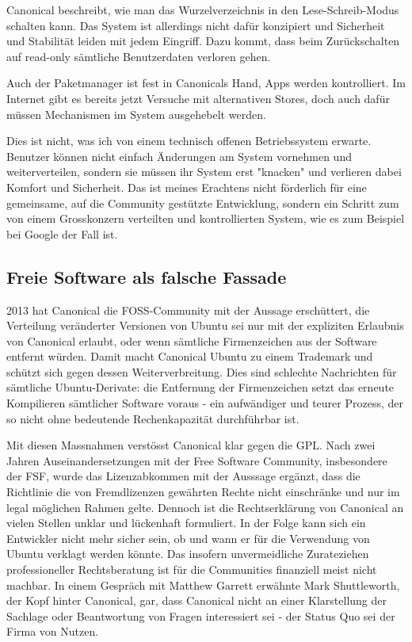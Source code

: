 Canonical beschreibt, wie man das Wurzelverzeichnis in den Lese-Schreib-Modus schalten kann\thinspace\cite{online:ubuntutouch-readwrite}. Das System ist allerdings nicht dafür konzipiert und Sicherheit und Stabilität leiden mit jedem Eingriff. Dazu kommt, dass beim Zurückschalten auf read-only sämtliche Benutzerdaten verloren gehen.

Auch der Paketmanager ist fest in Canonicals Hand, Apps werden kontrolliert\thinspace\cite{online:ubuntutouch-publish}. Im Internet gibt es bereits jetzt Versuche mit alternativen Stores, doch auch dafür müssen Mechanismen im System ausgehebelt werden\thinspace\cite{online:ubuntutouch-jailbreak}.

Dies ist nicht, was ich von einem technisch offenen Betriebssystem erwarte. Benutzer können nicht einfach Änderungen am System vornehmen und weiterverteilen, sondern sie müssen ihr System erst "knacken" und verlieren dabei Komfort und Sicherheit. Das ist meines Erachtens nicht förderlich für eine gemeinsame, auf die Community gestützte Entwicklung, sondern ein Schritt zum von einem Grosskonzern verteilten und kontrollierten System, wie es zum Beispiel bei Google der Fall ist.\\

\subsection{Freie Software als falsche Fassade}
2013 hat Canonical die FOSS-Community mit der Aussage erschüttert, die Verteilung veränderter Versionen von Ubuntu sei nur mit der expliziten Erlaubnis von Canonical erlaubt, oder wenn sämtliche Firmenzeichen aus der Software entfernt würden\thinspace\cite{online:ubuntutouch-mjgIn}. Damit macht Canonical Ubuntu zu einem Trademark und schützt sich gegen dessen Weiterverbreitung. Dies sind schlechte Nachrichten für sämtliche Ubuntu-Derivate: die Entfernung der Firmenzeichen setzt das erneute Kompilieren sämtlicher Software voraus\thinspace\cite{online:ubuntutouch-mjgLicense} - ein aufwändiger und teurer Prozess, der so nicht ohne bedeutende Rechenkapazität durchführbar ist.

Mit diesen Massnahmen verstösst Canonical klar gegen die GPL\thinspace\cite{online:ubuntutouch-fsf}. Nach zwei Jahren Auseinandersetzungen mit der Free Software Community, insbesondere der FSF, wurde das Lizenzabkommen mit der Ausssage ergänzt, dass die Richtlinie die von Fremdlizenzen gewährten Rechte nicht einschränke und nur im legal möglichen Rahmen gelte\thinspace\cite{online:ubuntutouch-ip}. Dennoch ist die Rechtserklärung von Canonical an vielen Stellen unklar und lückenhaft formuliert\thinspace\cite{online:ubuntutouch-uncertain}. In der Folge kann sich ein Entwickler nicht mehr sicher sein, ob und wann er für die Verwendung von Ubuntu verklagt werden könnte. Das insofern unvermeidliche Zurateziehen professioneller Rechtsberatung ist für die Communities finanziell meist nicht machbar\thinspace\cite{online:ubuntutouch-mjgLicense}. In einem Gespräch mit Matthew Garrett\thinspace\cite{online:ubuntutouch-mjgConversation} erwähnte Mark Shuttleworth, der Kopf hinter Canonical, gar, dass Canonical nicht an einer Klarstellung der Sachlage oder Beantwortung von Fragen interessiert sei - der Status Quo sei der Firma von Nutzen.

